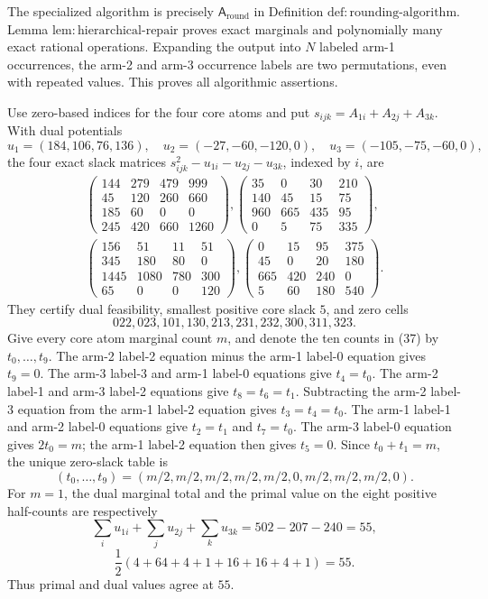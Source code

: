 The specialized algorithm is precisely \(\mathsf A_{\mathrm{round}}\) in Definition \(\mathrm{def{:}rounding\mbox{-}algorithm}\).  Lemma \(\mathrm{lem{:}hierarchical\mbox{-}repair}\) proves exact marginals and polynomially many exact rational operations.  Expanding the output into \(N\) labeled arm-1 occurrences, the arm-2 and arm-3 occurrence labels are two permutations, even with repeated values.  This proves all algorithmic assertions.

Use zero-based indices for the four core atoms and put \(s_{ijk}=A_{1i}+A_{2j}+A_{3k}\).  With dual potentials
\[
 u_1=(184,106,76,136),\quad u_2=(-27,-60,-120,0),\quad
 u_3=(-105,-75,-60,0),
\]
the four exact slack matrices \(s_{ijk}^2-u_{1i}-u_{2j}-u_{3k}\), indexed by \(i\), are
\[
\begin{gathered}
\begin{pmatrix}144&279&479&999\\45&120&260&660\\185&60&0&0\\245&420&660&1260\end{pmatrix},
\begin{pmatrix}35&0&30&210\\140&45&15&75\\960&665&435&95\\0&5&75&335\end{pmatrix},\\[2pt]
\begin{pmatrix}156&51&11&51\\345&180&80&0\\1445&1080&780&300\\65&0&0&120\end{pmatrix},
\begin{pmatrix}0&15&95&375\\45&0&20&180\\665&420&240&0\\5&60&180&540\end{pmatrix}.
\end{gathered} \tag{36}
\]
They certify dual feasibility, smallest positive core slack \(5\), and zero cells
\[
 022,023,101,130,213,231,232,300,311,323. \tag{37}
\]
Give every core atom marginal count \(m\), and denote the ten counts in (37) by \(t_0,\ldots,t_9\).  The arm-2 label-2 equation minus the arm-1 label-0 equation gives \(t_9=0\).  The arm-3 label-3 and arm-1 label-0 equations give \(t_4=t_0\).  The arm-2 label-1 and arm-3 label-2 equations give \(t_8=t_6=t_1\).  Subtracting the arm-2 label-3 equation from the arm-1 label-2 equation gives \(t_3=t_4=t_0\).  The arm-1 label-1 and arm-2 label-0 equations give \(t_2=t_1\) and \(t_7=t_0\).  The arm-3 label-0 equation gives \(2t_0=m\); the arm-1 label-2 equation then gives \(t_5=0\).  Since \(t_0+t_1=m\), the unique zero-slack table is
\[
 (t_0,\ldots,t_9)=(m/2,m/2,m/2,m/2,m/2,0,m/2,m/2,m/2,0). \tag{38}
\]
For \(m=1\), the dual marginal total and the primal value on the eight positive half-counts are respectively
\[
 \sum_i u_{1i}+\sum_j u_{2j}+\sum_k u_{3k}=502-207-240=55,
\]
\[
 \frac12(4+64+4+1+16+16+4+1)=55. \tag{38a}
\]
Thus primal and dual values agree at \(55\).

